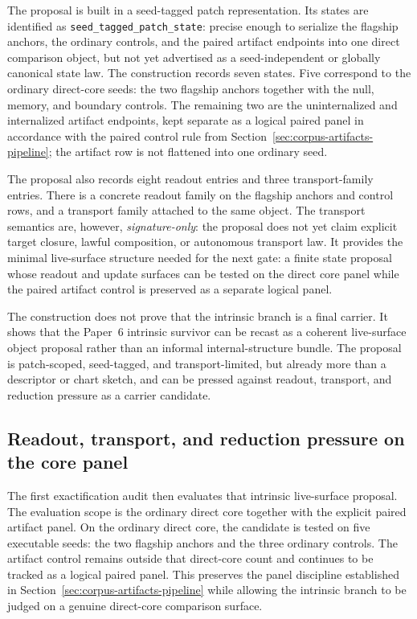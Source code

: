 \documentclass[11pt]{article}
\theoremstyle{definition}
\begin{document}
The proposal is built in a seed-tagged patch representation. Its states are identified
as \texttt{seed\_tagged\_patch\_state}: precise enough to serialize the flagship
anchors, the ordinary controls, and the paired artifact endpoints into one direct
comparison object, but not yet advertised as a seed-independent or globally canonical
state law. The construction records seven states. Five correspond to the ordinary
direct-core seeds: the two flagship anchors together with the null, memory, and
boundary controls. The remaining two are the uninternalized and internalized artifact
endpoints, kept separate as a logical paired panel in accordance with the paired
control rule from Section~\ref{sec:corpus-artifacts-pipeline}; the artifact row is not
flattened into one ordinary seed.

The proposal also records eight readout entries and three transport-family entries.
There is a concrete readout family on the flagship anchors and control rows, and a
transport family attached to the same object. The transport semantics are, however,
\emph{signature-only}: the proposal does not yet claim explicit target closure, lawful
composition, or autonomous transport law. It provides the minimal live-surface
structure needed for the next gate: a finite state proposal whose readout and update
surfaces can be tested on the direct core panel while the paired artifact control is
preserved as a separate logical panel.

The construction does not prove that the intrinsic branch is a final carrier. It shows
that the Paper~6 intrinsic survivor can be recast as a coherent live-surface object
proposal rather than an informal internal-structure bundle. The proposal is
patch-scoped, seed-tagged, and transport-limited, but already more than a descriptor or
chart sketch, and can be pressed against readout, transport, and reduction pressure as
a carrier candidate.

\subsection{Readout, transport, and reduction pressure on the core panel}

The first exactification audit then evaluates that intrinsic live-surface proposal. The
evaluation scope is the ordinary direct core together with the explicit paired artifact
panel. On the ordinary direct core, the candidate is tested on five executable seeds:
the two flagship anchors and the three ordinary controls. The artifact control remains
outside that direct-core count and continues to be tracked as a logical paired panel.
This preserves the panel discipline established in Section~\ref{sec:corpus-artifacts-pipeline}
while allowing the intrinsic branch to be judged on a genuine direct-core comparison
surface.
\end{document}
